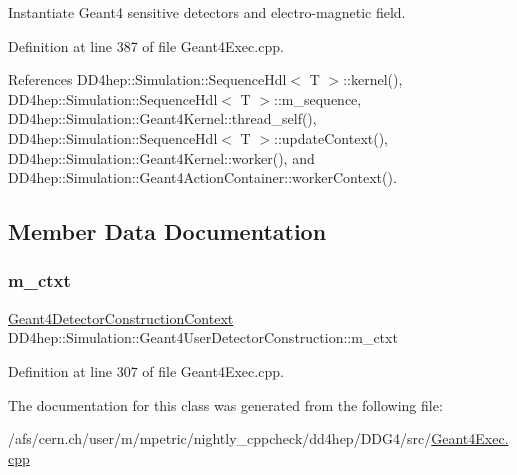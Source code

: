 Instantiate Geant4 sensitive detectors and electro-\/magnetic field. 

Definition at line 387 of file Geant4\+Exec.\+cpp.



References D\+D4hep\+::\+Simulation\+::\+Sequence\+Hdl$<$ T $>$\+::kernel(), D\+D4hep\+::\+Simulation\+::\+Sequence\+Hdl$<$ T $>$\+::m\+\_\+sequence, D\+D4hep\+::\+Simulation\+::\+Geant4\+Kernel\+::thread\+\_\+self(), D\+D4hep\+::\+Simulation\+::\+Sequence\+Hdl$<$ T $>$\+::update\+Context(), D\+D4hep\+::\+Simulation\+::\+Geant4\+Kernel\+::worker(), and D\+D4hep\+::\+Simulation\+::\+Geant4\+Action\+Container\+::worker\+Context().



\subsection{Member Data Documentation}
\hypertarget{class_d_d4hep_1_1_simulation_1_1_geant4_user_detector_construction_ab099fe83f02b9f8ffdda9f0f21a01202}{}\label{class_d_d4hep_1_1_simulation_1_1_geant4_user_detector_construction_ab099fe83f02b9f8ffdda9f0f21a01202} 
\subsubsection{\texorpdfstring{m\+\_\+ctxt}{m\_ctxt}}
{\footnotesize\ttfamily \hyperlink{class_d_d4hep_1_1_simulation_1_1_geant4_detector_construction_context}{Geant4\+Detector\+Construction\+Context} D\+D4hep\+::\+Simulation\+::\+Geant4\+User\+Detector\+Construction\+::m\+\_\+ctxt\hspace{0.3cm}{\ttfamily [protected]}}



Definition at line 307 of file Geant4\+Exec.\+cpp.



The documentation for this class was generated from the following file\+:\begin{DoxyCompactItemize}
\item 
/afs/cern.\+ch/user/m/mpetric/nightly\+\_\+cppcheck/dd4hep/\+D\+D\+G4/src/\hyperlink{_geant4_exec_8cpp}{Geant4\+Exec.\+cpp}\end{DoxyCompactItemize}
